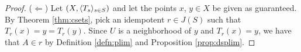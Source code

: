 \begin{proof}
   ($\Leftarrow$) Let $(X, \langle T_s \rangle_{s \in S})$ and let the points $x$, $y \in X$ be given as
   guaranteed.
   By Theorem \ref{thm:csets}, pick an idempotent $r \in J(S)$
   such that $T_r(x) = y = T_r(y)$. 
   Since $U$ is a neighborhood of $y$ and $T_r(x) = y$, we have that
   $A \in r$ by Definition \ref{defn:plim} and Proposition \ref{prop:dsplim}. 
 \end{proof}

\theendnotes

